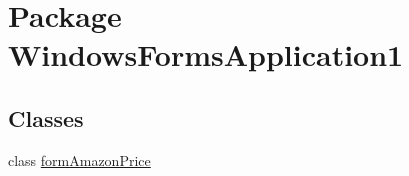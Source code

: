 \hypertarget{namespace_windows_forms_application1}{\section{Package Windows\-Forms\-Application1}
\label{namespace_windows_forms_application1}
}
\subsection*{Classes}
\begin{DoxyCompactItemize}
\item 
class \hyperlink{class_windows_forms_application1_1_1form_amazon_price}{form\-Amazon\-Price}
\end{DoxyCompactItemize}
